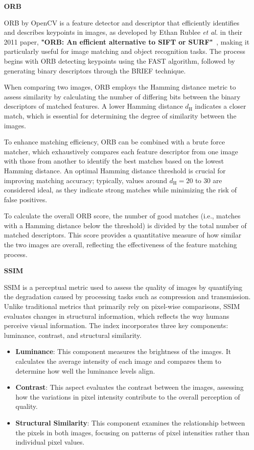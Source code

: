 \documentclass[12pt,DIV14,BCOR12mm,a4paper,footinclude=false,headinclude,parskip=half-,twoside,openright,cleardoublepage=empty,toc=index,bibliography=totoc,listof=totoc]{scrreprt}
\numberwithin{equation}{chapter}
\begin{document}
\textbf{ORB}

ORB by OpenCV is a feature detector and descriptor that efficiently identifies and describes keypoints in images, as developed by Ethan Rublee \textit{et al.} in their 2011 paper, \textbf{"ORB: An efficient alternative to SIFT or SURF"}~\cite{ORB}, making it particularly useful for image matching and object recognition tasks. The process begins with ORB detecting keypoints using the FAST algorithm, followed by generating binary descriptors through the BRIEF technique.

When comparing two images, ORB employs the Hamming distance metric to assess similarity by calculating the number of differing bits between the binary descriptors of matched features. A lower Hamming distance \(d_{\mathrm{H}}\) indicates a closer match, which is essential for determining the degree of similarity between the images.

To enhance matching efficiency, ORB can be combined with a brute force matcher, which exhaustively compares each feature descriptor from one image with those from another to identify the best matches based on the lowest Hamming distance. An optimal Hamming distance threshold is crucial for improving matching accuracy; typically, values around \(d_{\mathrm{H}} = 20\) to \(30\) are considered ideal, as they indicate strong matches while minimizing the risk of false positives.

To calculate the overall ORB score, the number of good matches (i.e., matches with a Hamming distance below the threshold) is divided by the total number of matched descriptors. This score provides a quantitative measure of how similar the two images are overall, reflecting the effectiveness of the feature matching process.

\textbf{SSIM}

SSIM is a perceptual metric used to assess the quality of images by quantifying the degradation caused by processing tasks such as compression and transmission. Unlike traditional metrics that primarily rely on pixel-wise comparisons, SSIM evaluates changes in structural information, which reflects the way humans perceive visual information. The index incorporates three key components: luminance, contrast, and structural similarity.

\begin{itemize}
    \item \textbf{Luminance}: This component measures the brightness of the images. It calculates the average intensity of each image and compares them to determine how well the luminance levels align.
    
    \item \textbf{Contrast}: This aspect evaluates the contrast between the images, assessing how the variations in pixel intensity contribute to the overall perception of quality.
    
    \item \textbf{Structural Similarity}: This component examines the relationship between the pixels in both images, focusing on patterns of pixel intensities rather than individual pixel values.
\end{itemize}
\end{document}
